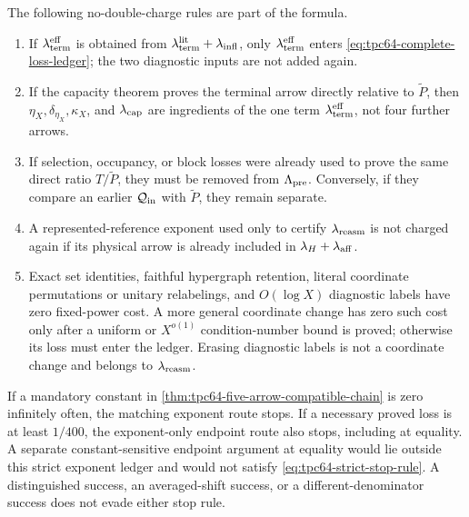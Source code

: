 The following no-double-charge rules are part of the formula.
\begin{enumerate}[label=\textup{(\alph*)},leftmargin=2.8em]
 \item If
       \(\lambda_{\rm term}^{\rm eff}\) is obtained from
       \(\lambda_{\rm term}^{\rm lit}+\lambda_{\rm infl}\), only
       \(\lambda_{\rm term}^{\rm eff}\) enters
       \eqref{eq:tpc64-complete-loss-ledger}; the two diagnostic inputs are
       not added again.
 \item If the capacity theorem proves the terminal arrow directly relative
       to \(\widetilde P\), then
       \(\eta_X,\delta_{\eta_X},\kappa_X\), and
       \(\lambda_{\rm cap}\) are ingredients of the one term
       \(\lambda_{\rm term}^{\rm eff}\), not four further arrows.
 \item If selection, occupancy, or block losses were already used to prove
       the same direct ratio \(T/\widetilde P\), they must be removed from
       \(\Lambda_{\rm pre}\).  Conversely, if they compare an earlier
       \(\mathcal Q_{\rm in}\) with \(\widetilde P\), they remain separate.
 \item A represented-reference exponent used only to certify
       \(\lambda_{\rm reasm}\) is not charged again if its physical arrow
       is already included in \(\lambda_H+\lambda_{\rm aff}\).
 \item Exact set identities, faithful hypergraph retention, literal
       coordinate permutations or unitary relabelings, and \(O(\log X)\)
       diagnostic labels have zero fixed-power cost.  A more general
       coordinate change has zero such cost only after a uniform or
       \(X^{o(1)}\) condition-number bound is proved; otherwise its loss
       must enter the ledger.  Erasing diagnostic labels is not a
       coordinate change and belongs to \(\lambda_{\rm reasm}\).
\end{enumerate}

If a mandatory constant in
\cref{thm:tpc64-five-arrow-compatible-chain} is zero infinitely often,
the matching exponent route stops.  If a necessary proved loss is at
least \(1/400\), the exponent-only endpoint route also stops, including at
equality.  A separate constant-sensitive endpoint argument at equality
would lie outside this strict exponent ledger and would not satisfy
\eqref{eq:tpc64-strict-stop-rule}.  A distinguished success, an
averaged-shift success, or a different-denominator success does not evade
either stop rule.
